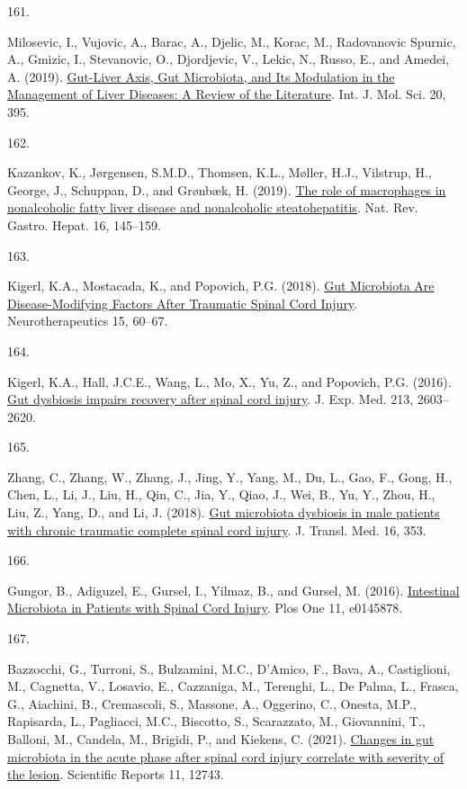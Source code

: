 \documentclass[
]{article}
\newlength{\cslhangindent}
\newlength{\csllabelwidth}
\newlength{\cslentryspacingunit} %
\newenvironment{CSLReferences}[2] %
 {%
  \setlength{\parindent}{0pt}
  \ifodd #1
  \let\oldpar\par
  \def\par{\hangindent=\cslhangindent\oldpar}
  \fi
  \setlength{\parskip}{#2\cslentryspacingunit}
 }%
 {}
\newcommand{\CSLLeftMargin}[1]{\parbox[t]{\csllabelwidth}{#1}}
\newcommand{\CSLRightInline}[1]{\parbox[t]{\linewidth - \csllabelwidth}{#1}\break}
\begin{document}
\begin{CSLReferences}{0}{0}
\leavevmode{}%
\CSLLeftMargin{161. }
\CSLRightInline{Milosevic, I., Vujovic, A., Barac, A., Djelic, M., Korac, M., Radovanovic Spurnic, A., Gmizic, I., Stevanovic, O., Djordjevic, V., Lekic, N., Russo, E., and Amedei, A. (2019). \href{https://doi.org/10.3390/ijms20020395}{Gut-{Liver Axis}, {Gut Microbiota}, and {Its Modulation} in the {Management} of {Liver Diseases}: {A Review} of the {Literature}}. Int. J. Mol. Sci. 20, 395.}

\leavevmode{}%
\CSLLeftMargin{162. }
\CSLRightInline{Kazankov, K., Jørgensen, S.M.D., Thomsen, K.L., Møller, H.J., Vilstrup, H., George, J., Schuppan, D., and Grønbæk, H. (2019). \href{https://doi.org/10.1038/s41575-018-0082-x}{The role of macrophages in nonalcoholic fatty liver disease and nonalcoholic steatohepatitis}. Nat. Rev. Gastro. Hepat. 16, 145--159.}

\leavevmode{}%
\CSLLeftMargin{163. }
\CSLRightInline{Kigerl, K.A., Mostacada, K., and Popovich, P.G. (2018). \href{https://doi.org/10.1007/s13311-017-0583-2}{Gut {Microbiota Are Disease-Modifying Factors After Traumatic Spinal Cord Injury}}. Neurotherapeutics 15, 60--67.}

\leavevmode{}%
\CSLLeftMargin{164. }
\CSLRightInline{Kigerl, K.A., Hall, J.C.E., Wang, L., Mo, X., Yu, Z., and Popovich, P.G. (2016). \href{https://doi.org/10.1084/jem.20151345}{Gut dysbiosis impairs recovery after spinal cord injury}. J. Exp. Med. 213, 2603--2620.}

\leavevmode{}%
\CSLLeftMargin{165. }
\CSLRightInline{Zhang, C., Zhang, W., Zhang, J., Jing, Y., Yang, M., Du, L., Gao, F., Gong, H., Chen, L., Li, J., Liu, H., Qin, C., Jia, Y., Qiao, J., Wei, B., Yu, Y., Zhou, H., Liu, Z., Yang, D., and Li, J. (2018). \href{https://doi.org/10.1186/s12967-018-1735-9}{Gut microbiota dysbiosis in male patients with chronic traumatic complete spinal cord injury}. J. Transl. Med. 16, 353.}

\leavevmode{}%
\CSLLeftMargin{166. }
\CSLRightInline{Gungor, B., Adiguzel, E., Gursel, I., Yilmaz, B., and Gursel, M. (2016). \href{https://doi.org/10.1371/journal.pone.0145878}{Intestinal {Microbiota} in {Patients} with {Spinal Cord Injury}}. Plos One 11, e0145878.}

\leavevmode{}%
\CSLLeftMargin{167. }
\CSLRightInline{Bazzocchi, G., Turroni, S., Bulzamini, M.C., D'Amico, F., Bava, A., Castiglioni, M., Cagnetta, V., Losavio, E., Cazzaniga, M., Terenghi, L., De Palma, L., Frasca, G., Aiachini, B., Cremascoli, S., Massone, A., Oggerino, C., Onesta, M.P., Rapisarda, L., Pagliacci, M.C., Biscotto, S., Scarazzato, M., Giovannini, T., Balloni, M., Candela, M., Brigidi, P., and Kiekens, C. (2021). \href{https://doi.org/10.1038/s41598-021-92027-z}{Changes in gut microbiota in the acute phase after spinal cord injury correlate with severity of the lesion}. Scientific Reports 11, 12743.}


\end{CSLReferences}
\end{document}
